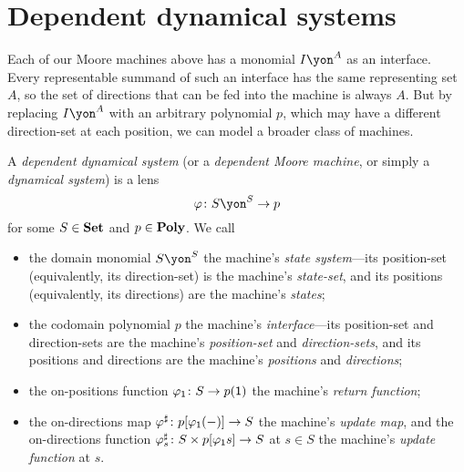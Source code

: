 \documentclass[Book-Poly]{subfiles}
\begin{document}
\section{Dependent dynamical systems}\label{sec.poly.dyn_sys.depend_sys}

Each of our Moore machines above has a monomial $I\yon^A$ as an interface.
Every representable summand of such an interface has the same representing set $A$, so the set of directions that can be fed into the machine is always $A$.
But by replacing $I\yon^A$ with an arbitrary polynomial $p$, which may have a different direction-set at each position, we can model a broader class of machines.

\begin{definition}\label{def.gen_moore}
  A \emph{dependent dynamical system} (or a \emph{dependent Moore machine}, or simply a \emph{dynamical system}) is a lens \[\varphi\colon S\yon^S\to p\] for some $S\in\mathbf{Set}$ and $p\in\mathbf{Poly}$.
  We call
  \begin{itemize}
    \item the domain monomial $S\yon^S$ the machine's \emph{state system}---its position-set (equivalently, its direction-set) is the machine's \emph{state-set}, and its positions (equivalently, its directions) are the machine's \emph{states};
    \item the codomain polynomial $p$ the machine's \emph{interface}---its position-set and direction-sets are the machine's \emph{position-set} and \emph{direction-sets}, and its positions and directions are the machine's \emph{positions} and \emph{directions};
    \item the on-positions function $\varphi_{\textsf{1}}\colon S\to p(\textsf{1})$ the machine's \emph{return function};
    \item the on-directions map $\varphi^\sharp\colon p[\varphi_{\textsf{1}}(-)]\to S$ the machine's \emph{update map}, and the on-directions function $\varphi^\sharp_s\colon S\times p[\varphi_{\textsf{1}}s]\to S$ at $s\in S$ the machine's \emph{update function} at $s$.
  \end{itemize}
\end{definition}
\end{document}
